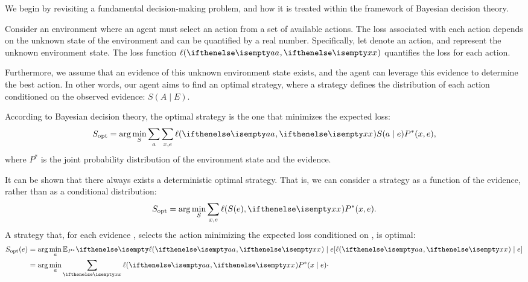 
\newcommand{\util}[1][{\rval[]{a}}]{\ell(#1, \rval[]{x})}
\newcommand{\envDist}{P^*}
\newcommand{\post}{\pi(\rval[i]{x} \mid \paramValue)}

We begin by revisiting a fundamental decision-making problem, and how it is treated within the framework of Bayesian
decision theory.

Consider an environment where an agent must select an action from a set of available actions.
The loss associated with each action depends on the unknown state of the environment
and can be quantified by a real number.
Specifically, let  denote an action, and  represent the unknown environment state.
The loss function  $\util$ quantifies the loss for each action.

Furthermore, we assume that an evidence  of this unknown environment state exists, and the agent can leverage
this evidence to determine the best action.
In other words, our agent aims to find an optimal strategy, where a strategy defines the distribution of each
action conditioned on the observed evidence: $S(A \mid E)$.

According to Bayesian decision theory, the optimal strategy is the one that minimizes the expected loss:
\begin{equation*}
    S_{\text{opt}} = \arg\min_S\sum_a\sum_{x,e} \util S(a \mid e)\envDist(x, e),
\end{equation*}
where $\envDist$ is the joint probability distribution of the environment state and the evidence.

It can be shown that there always exists a deterministic optimal strategy.
That is, we can consider a strategy as a function of the evidence, rather than as a conditional distribution:
\[
    S_{\text{opt}} = \arg\min_S \sum_{x,e} \util[S(e)] \envDist(x, e).
\]
A strategy that, for each evidence , selects the action minimizing the expected loss conditioned
on , is optimal:
\begin{align*}
    S_{\text{opt}}(e) &= \arg\min_a \Ex{\envDist}{\util \mid e} \\
    &= \arg\min_a\sumx \util \envDist(x \mid e) \cdot
    \label{eq:bayes-action}
\end{align*}

